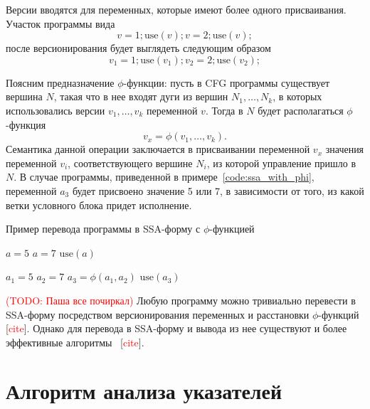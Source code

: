 \documentclass[14pt,titlepage]{extarticle}
\let\oldphi\phi
\renewcommand{\phi}{\ensuremath{\oldphi}}
\newcommand{\todo}[1]{\textcolor{red}{(\eng{TODO}: #1)}}
\newcommand{\todocite}{[\textcolor{red}{\eng{cite}}]}
\newcommand{\eng}[1]{{\English#1}}
\let\oldsection\section
\renewcommand{\section}{\newpage\oldsection}
\begin{document}
    Версии вводятся для переменных, которые имеют более одного присваивания.
    Участок программы вида
    \[ v = 1; \textrm{use}(v); v = 2; \textrm{use}(v); \]
    после версионирования будет выглядеть следующим образом
    \[ v_1 = 1; \textrm{use}(v_1); v_2 = 2; \textrm{use}(v_2); \]

    Поясним предназначение \phi-функции: пусть в CFG программы существует
    вершина $N$, такая что в нее входят дуги из вершин $N_1, \ldots, N_k$, в
    которых использовались версии $v_1, \ldots, v_k$ переменной $v$. Тогда в
    $N$ будет располагаться \phi-функция
    \[ v_x = \phi(v_1, \ldots, v_k). \]
    Семантика данной операции заключается в присваивании переменной $v_x$
    значения переменной $v_i$, соответствующего вершине $N_i$, из которой
    управление пришло в $N$. В случае программы, приведенной в
    примере~\ref{code:ssa_with_phi}, переменной $a_3$ будет присвоено значение
    5 или 7, в зависимости от того, из какой ветки условного блока придет
    исполнение.

    \begin{algorithm}
      \caption{Пример перевода программы в SSA-форму с \phi-функцией}
      \label{code:ssa_with_phi}
      \begin{multicols*}{2}
        \begin{algorithmic}[1]
          \IF{\ldots}
            \STATE $a = 5$
          \ELSE
            \STATE $a = 7$
          \ENDIF
          \STATE $\textrm{use}(a)$
        \end{algorithmic}
        \columnbreak
        \begin{algorithmic}[1]
          \IF{\ldots}
            \STATE $a_1 = 5$
          \ELSE
            \STATE $a_2 = 7$
          \ENDIF
          \STATE $a_3 = \phi(a_1, a_2)$
          \STATE $\textrm{use}(a_3)$
        \end{algorithmic}
      \end{multicols*}
    \end{algorithm}

    \todo{Паша все почиркал}
    Любую программу можно тривиально перевести в SSA-форму посредством
    версионирования переменных и расстановки \phi-функций \todocite.
    Однако для перевода в SSA-форму и вывода из нее существуют и более
    эффективные алгоритмы~\cite{ssa} \todocite.

  \section{Алгоритм анализа указателей}
    \label{section:algorithm}
\end{document}
